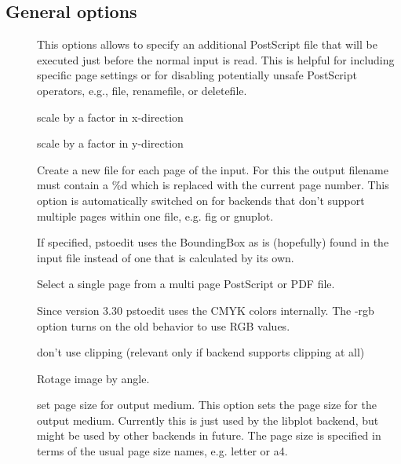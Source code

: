 \documentclass[english,a4paper]{article}
\begin{document}
\subsection{General options}
\begin{description}
\item[] 
This options allows to specify an additional PostScript file that will be executed just before the normal input is read. This is helpful for including specific page settings or for disabling potentially unsafe PostScript operators, e.g., file, renamefile, or deletefile. 


\item[] 
scale by a factor in x-direction


\item[] 
scale by a factor in y-direction


\item[] 
Create a new file for each page of the input. For this the output filename must contain a \%d which is replaced with the current page number. This option is automatically switched on for backends that don't support multiple pages within one file, e.g. fig or gnuplot. 


\item[] 
If specified, pstoedit uses the BoundingBox as is (hopefully) found in the input file instead of one that is calculated by its own. 


\item[] 
Select a single page from a multi page PostScript or PDF file. 


\item[] 
Since version 3.30 pstoedit uses the CMYK colors internally. The -rgb option turns on the old behavior to use RGB values.


\item[] 
don't use clipping (relevant only if backend supports clipping at all)


\item[] 
Rotage image by angle.


\item[] 
set page size for output medium.  
This option sets the page size for the output medium. Currently this is just used by the libplot backend, but might be used by other  backends in future. The page size is specified in terms of the usual page size names, e.g. letter or a4. 



\end{description}
\end{document}
